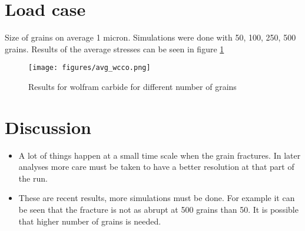 \documentclass[wcco.tex]{subfiles}
\begin{document}
\section{Load case}
Size of grains on average 1 micron. Simulations were done with 50, 100, 250, 500 grains. Results of the average stresses can be seen in figure \ref{fig:wcco_res}

\begin{figure}[ht]
\centering
\texttt{[image: figures/avg\_wcco.png]}
\caption{Results for wolfram carbide for different number of grains}
\label{fig:wcco_res}
\end{figure}


\section{Discussion}
\begin{itemize}
\item A lot of things happen at a small time scale when the grain fractures. In later analyses more care must be taken to have a better resolution at that part of the run.
\item These are recent results, more simulations must be done. For example it can be seen that the fracture is not as abrupt at 500 grains than 50. It is possible that higher number of grains is needed.
\end{itemize}
\end{document}
